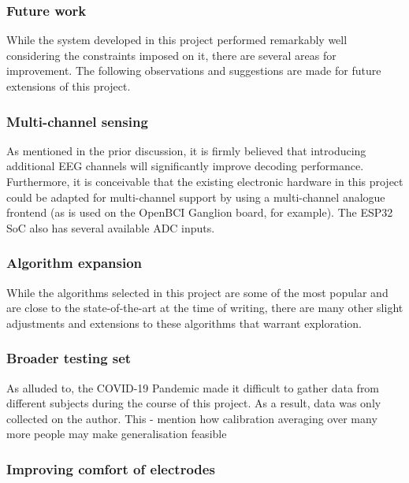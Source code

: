 \subsubsection{Future work}
While the system developed in this project performed remarkably well considering the constraints imposed on it, there are several areas for improvement. The following observations and suggestions are made for future extensions of this project. 

\subsubsection{Multi-channel sensing}
As mentioned in the prior discussion, it is firmly believed that introducing additional EEG channels will significantly improve decoding performance. Furthermore, it is conceivable that the existing electronic hardware in this project could be adapted for multi-channel support by using a multi-channel analogue frontend (as is used on the OpenBCI Ganglion board, for example). The ESP32 SoC also has several available ADC inputs.

\subsubsection{Algorithm expansion}
While the algorithms selected in this project are some of the most popular and are close to the state-of-the-art at the time of writing, there are many other slight adjustments and extensions to these algorithms that warrant exploration. 

\subsubsection{Broader testing set}
As alluded to, the COVID-19 Pandemic made it difficult to gather data from different subjects during the course of this project. As a result, data was only collected on the author. This 
- mention how calibration averaging over many more people may make generalisation feasible



\subsubsection{Improving comfort of electrodes}

